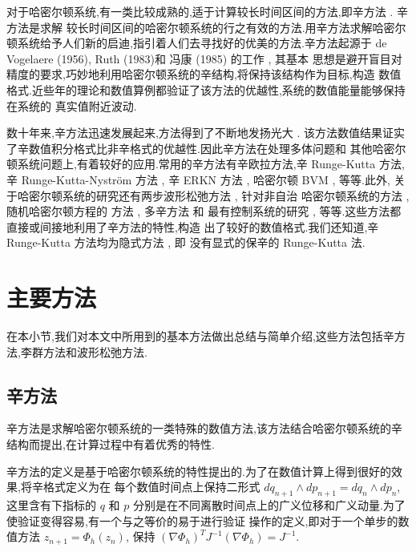 对于哈密尔顿系统,有一类比较成熟的,适于计算较长时间区间的方法,即辛方法 \cite{feng2010symplectic}. 辛方法是求解
较长时间区间的哈密尔顿系统的行之有效的方法.用辛方法求解哈密尔顿系统给予人们新的启迪,指引着人们去寻找好的优美的方法.辛方法起源于
de Vogelaere (1956), Ruth (1983)和 冯康 (1985) 的工作 \cite{hairer2006geometric}, 其基本
思想是避开盲目对精度的要求,巧妙地利用哈密尔顿系统的辛结构,将保持该结构作为目标,构造
数值格式.近些年的理论和数值算例都验证了该方法的优越性,系统的数值能量能够保持在系统的
真实值附近波动.

数十年来,辛方法迅速发展起来,方法得到了不断地发扬光大 \cite{calvo1994numerical,leimkuhler2004simulating,hong2006multi,yang2009extended,monovasilis2013exponentially,xin2016birkhoffian,michalas2016numerical,liao2016multi}. 该方法数值结果证实了辛数值积分格式比非辛格式的优越性.因此辛方法在处理多体问题和
其他哈密尔顿系统问题上,有着较好的应用.常用的辛方法有辛欧拉方法,辛 Runge-Kutta 方法,
辛 Runge-Kutta-Nystr{\"o}m 方法 \cite{kalogiratou2014fourth,kalogiratou2015}, 辛 ERKN
方法 \cite{wang2014ahigh}, 哈密尔顿 BVM \cite{brugnano2014multi}, 等等.此外,
关于哈密尔顿系统的研究还有两步波形松弛方法 \cite{hassanzadeh2014two}, 针对非自治
哈密尔顿系统的方法 \cite{hong2000numerical,zhang2010anote}, 随机哈密尔顿方程的
方法 \cite{burrage2014structure,ma2015sto,fan2015using}, 多辛方法 \cite{wang2013multi} 和
最有控制系统的研究 \cite{li2015asym}, 等等.这些方法都直接或间接地利用了辛方法的特性,构造
出了较好的数值格式.我们还知道,辛 Runge-Kutta 方法均为隐式方法 \cite{sanz1988runge}, 即
没有显式的保辛的 Runge-Kutta 法.

\section{主要方法}
在本小节,我们对本文中所用到的基本方法做出总结与简单介绍,这些方法包括辛方法,李群方法和波形松弛方法.

\subsection{辛方法}

辛方法是求解哈密尔顿系统的一类特殊的数值方法,该方法结合哈密尔顿系统的辛结构而提出,在计算过程中有着优秀的特性.

辛方法的定义是基于哈密尔顿系统的特性提出的.为了在数值计算上得到很好的效果,将辛格式定义为在
每个数值时间点上保持二形式 $dq_{n+1}\wedge dp_{n+1}=dq_n\wedge dp_n$, 这里含有下指标的 $q$ 和 $p$
分别是在不同离散时间点上的广义位移和广义动量.为了使验证变得容易,有一个与之等价的易于进行验证
操作的定义,即对于一个单步的数值方法 $z_{n+1}=\Phi_h(z_n)$, 保持 $(\nabla\Phi_h)^TJ^{-1}(\nabla\Phi_h)=J^{-1}$.

